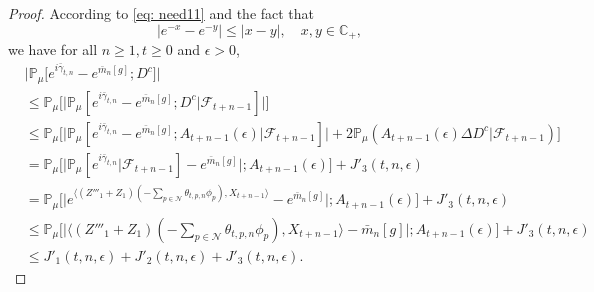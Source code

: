 \documentclass[12pt,a4paper]{amsart}
\theoremstyle{plain}
\theoremstyle{definition}
\numberwithin{equation}{section}
\begin{document}
\begin{proof}
    According to \eqref{eq: need11} and the fact that
\[
	|e^{-x} - e^{-y}| \leq |x-y|,\quad x,y \in \mathbb C_+,
\]
    we have for all $n\geq 1, t\geq 0$ and $\epsilon> 0$,
\begin{align}
\label{eq: inequality that will used later1}
    &\big|\mathbb{P}_{\mu}\big[e^{i\bar{\gamma}_{t,n}}-e^{\bar{m}_n[g]}; D^c\big]\big|
    \\& \leq \mathbb{P}_{\mu}\Big[\big| \mathbb{P}_{\mu}[e^{i\bar{\gamma}_{t,n}}-e^{\bar{m}_n[g]}; D^c | \mathscr F_{t+n-1}]\big|\Big]
    \\& \leq \mathbb{P}_{\mu}\Big[\big| \mathbb{P}_{\mu}[e^{i\bar{\gamma}_{t,n}}-e^{\bar{m}_n[g]}; A_{t+n-1}(\epsilon)| \mathscr F_{t+n-1}]\big| + 2\mathbb P_\mu(A_{t+n-1}(\epsilon) \Delta D^c| \mathscr F_{t+n-1})\Big]
    \\& = \mathbb{P}_{\mu}\Big[ \big|\mathbb{P}_{\mu}[e^{i\bar{\gamma}_{t,n}}| \mathscr F_{t+n-1}]-e^{\bar{m}_n[g]}\big|;A_{t+n-1}(\epsilon)\Big] + J'_3(t,n,\epsilon)
    \\&=\mathbb{P}_{\mu}\Big[\big|e^{\langle (Z'''_1+Z_1)(-\sum_{p\in \mathcal{N}}\theta_{t,p,n}\phi_p), X_{t+n-1}\rangle}-e^{\bar{m}_n[g]}\big|;A_{t+n-1}(\epsilon)\Big]+ J'_3(t,n,\epsilon)
    \\&\leq \mathbb{P}_{\mu}\Big[\big|\langle (Z'''_1+Z_1)(-\sum_{p\in \mathcal{N}}
 \theta_{t,p,n}\phi_p), X_{t+n-1}\rangle-\bar{m}_n[g]\big|;A_{t+n-1}(\epsilon)\Big]+ J'_3(t,n,\epsilon)
    \\&\leq J'_1(t,n,\epsilon)+J'_2(t,n,\epsilon)+J'_3(t,n,\epsilon).
\end{align}


\end{proof}
\end{document}
